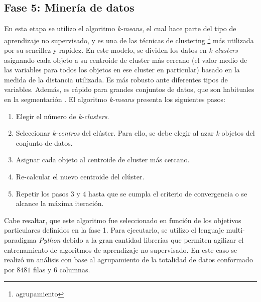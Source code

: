\subsection*{Fase 5: Minería de datos}
En esta etapa se utilizo el algoritmo \textit{k-means}, el cual hace parte del tipo de aprendizaje no supervisado, y es una de las técnicas de clustering \footnote{agrupamiento} más utilizada por su sencillez y rapidez. En este modelo, se dividen los datos en \textit{k-clusters} asignando cada objeto a su centroide de cluster más cercano (el valor medio de las variables para todos los objetos en ese cluster en particular) basado en la medida de la distancia utilizada. Es más robusto ante diferentes tipos de variables. Además, es rápido para grandes conjuntos de datos, que son habituales en la segmentación \cite{Dean2014}. El algoritmo \textit{k-means} presenta los siguientes pasos:

\begin{enumerate}
	\item Elegir el número de \textit{k-clusters}.
	\item Seleccionar \textit{k-centros} del clúster. Para ello, se debe elegir al azar \textit{k} objetos del conjunto de datos.
	\item Asignar cada objeto al centroide de cluster más cercano.
	\item Re-calcular el nuevo centroide del clúster.
	\item Repetir los pasos 3 y 4 hasta que se cumpla el criterio de convergencia o se alcance la máxima iteración.
\end{enumerate}

Cabe resaltar, que este algoritmo fue seleccionado en función de los objetivos particulares definidos en la fase 1. Para ejecutarlo, se utilizo el lenguaje multi-paradigma \textit{Python} debido a la gran cantidad librerías que permiten agilizar el entrenamiento de algoritmos de aprendizaje no supervisado. En este caso se realizó un análisis con base al agrupamiento de la totalidad de datos conformado por $8481$ filas y $6$ columnas. 

